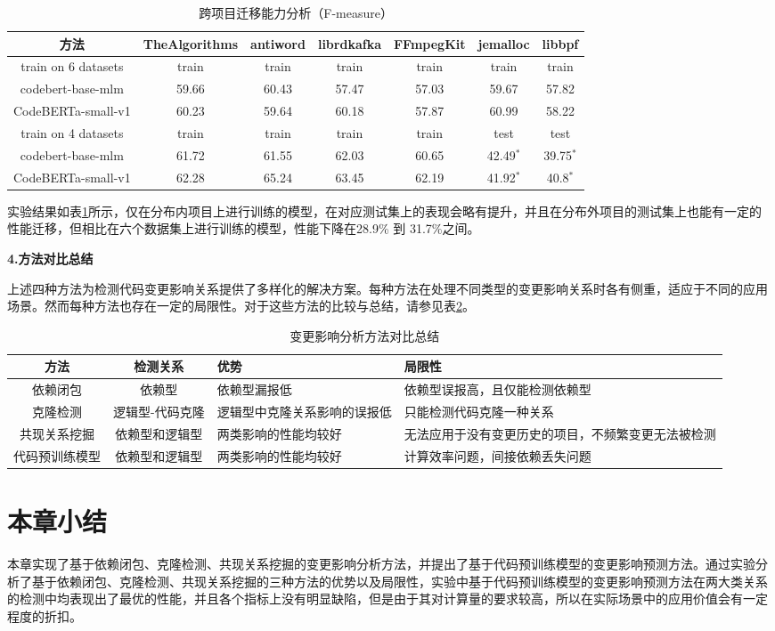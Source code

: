 \begin{table}[htbp]
\caption{跨项目迁移能力分析（F-measure）}
\label{1_跨项目迁移能力分析}
\vspace{0.5em}\centering\wuhao
\begin{tabular}{c|cccc|cc}
\toprule
方法& TheAlgorithms & antiword & librdkafka & FFmpegKit & jemalloc & libbpf\\
\midrule
train on 6 datasets & train & train & train & train & train & train \\
\midrule
codebert-base-mlm &  59.66 & 60.43 & 57.47 & 57.03 & 59.67 & 57.82\\
CodeBERTa-small-v1 &  60.23 & 59.64 & 60.18 & 57.87 & 60.99 & 58.22\\
\midrule
train on 4 datasets & train & train & train & train & test & test \\
\midrule
codebert-base-mlm &   61.72 & 61.55 & 62.03 & 60.65 & 42.49$^*$ & 39.75$^*$ \\
CodeBERTa-small-v1 &  62.28 & 65.24 & 63.45 & 62.19 & 41.92$^*$ & 40.8$^*$\\
\bottomrule
\end{tabular}
\end{table}

实验结果如表\ref{1_跨项目迁移能力分析}所示，仅在分布内项目上进行训练的模型，在对应测试集上的表现会略有提升，并且在分布外项目的测试集上也能有一定的性能迁移，但相比在六个数据集上进行训练的模型，性能下降在28.9\% 到 31.7\%之间。

\textbf{4.方法对比总结}

上述四种方法为检测代码变更影响关系提供了多样化的解决方案。每种方法在处理不同类型的变更影响关系时各有侧重，适应于不同的应用场景。然而每种方法也存在一定的局限性。对于这些方法的比较与总结，请参见表\ref{1_变更影响分析方法对比总结}。


\begin{table}[htbp]
\caption{变更影响分析方法对比总结}
\label{1_变更影响分析方法对比总结}
\vspace{0.5em}\centering\wuhao
\begin{tabular}{c|c|p{4cm}|p{4cm}}
\toprule
方法& 检测关系 & 优势 & 局限性\\
\midrule
依赖闭包 & 依赖型 & 依赖型漏报低 & 依赖型误报高，且仅能检测依赖型\\
\midrule
克隆检测 & 逻辑型-代码克隆 & 逻辑型中克隆关系影响的误报低 & 只能检测代码克隆一种关系\\
\midrule
共现关系挖掘  & 依赖型和逻辑型 & 两类影响的性能均较好 & 无法应用于没有变更历史的项目，不频繁变更无法被检测 \\
\midrule
代码预训练模型  & 依赖型和逻辑型 & 两类影响的性能均较好 & 计算效率问题，间接依赖丢失问题 \\
\bottomrule
\end{tabular}
\end{table}



\section{本章小结}

本章实现了基于依赖闭包、克隆检测、共现关系挖掘的变更影响分析方法，并提出了基于代码预训练模型的变更影响预测方法。通过实验分析了基于依赖闭包、克隆检测、共现关系挖掘的三种方法的优势以及局限性，实验中基于代码预训练模型的变更影响预测方法在两大类关系的检测中均表现出了最优的性能，并且各个指标上没有明显缺陷，但是由于其对计算量的要求较高，所以在实际场景中的应用价值会有一定程度的折扣。

